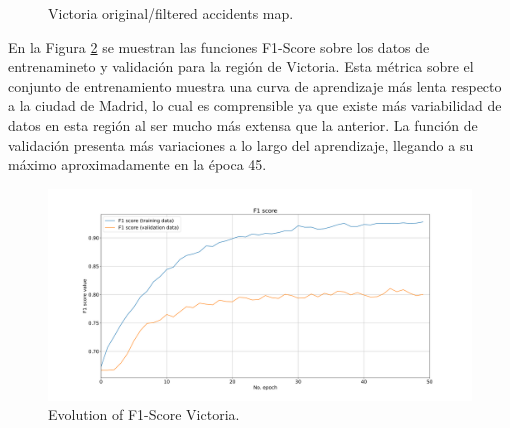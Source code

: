 \documentclass{uathesis-es}
\begin{document}
{	
	\begin{figure}[H]
		\centering
		\caption{Victoria original/filtered accidents map.}
		\label{VictoriaAccidentsMap}
	\end{figure}
	
	
	En la Figura \ref{VictoriaLossFunction} se muestran las funciones F1-Score sobre los datos de entrenamineto y validación para la región de Victoria. Esta métrica sobre el conjunto de entrenamiento muestra una curva de aprendizaje más lenta respecto a la ciudad de Madrid, lo cual es comprensible ya que existe más variabilidad de datos en esta región al ser mucho más extensa que la anterior. La función de validación presenta más variaciones a lo largo del aprendizaje, llegando a su máximo aproximadamente en la época 45.
	
	\begin{figure}[H]
		\centering
		\includegraphics[width=160mm]{Figures/Victoria/Victoria_convolution_2d_f1_score_paper.png}
		\caption{Evolution of F1-Score Victoria.}
		\label{VictoriaLossFunction}
	\end{figure}
	
}
\end{document}
